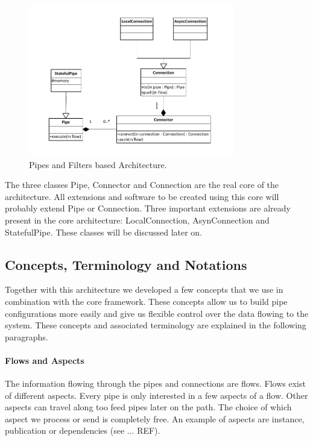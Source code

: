 \begin{figure}[htp]
	\centering
		\includegraphics[width=0.8\textwidth]{fig/architecturev2}
	\caption{Pipes and Filters based Architecture.}
	\label{fig:architecturev2}
\end{figure}

The three classes Pipe, Connector and Connection are the real core of the architecture. All extensions and software to be created using this core will probably extend Pipe or Connection. Three important extensions are already present in the core architecture: LocalConnection, AsynConnection and StatefulPipe. These classes will be discussed later on.

\subsection{Concepts, Terminology and Notations}

Together with this architecture we developed a few concepts that we use in combination with the core framework. These concepts allow us to build pipe configurations more easily and give us flexible control over the data flowing to the system. These concepts and associated terminology are explained in the following paragraphs.

\paragraph{Flows and Aspects} The information flowing through the pipes and connections are flows. Flows exist of different aspects. Every pipe is only interested in a few aspects of a flow. Other aspects can travel along too feed pipes later on the path. The choice of which aspect we process or send is completely free. An example of aspects are instance, publication or dependencies (see ... REF).


